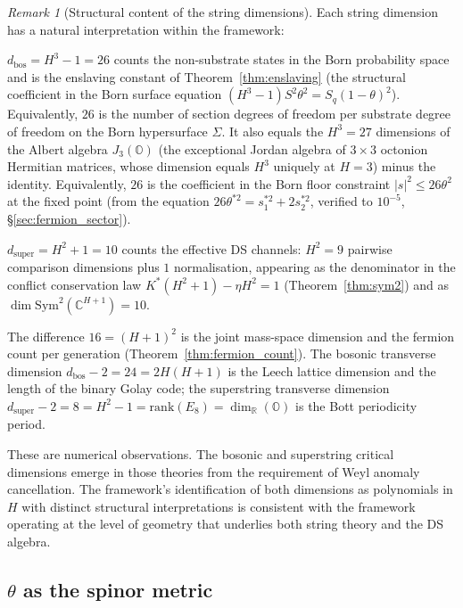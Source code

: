\documentclass[11pt,a4paper]{article}
\theoremstyle{definition}
\theoremstyle{remark}
\newtheorem{remark}[theorem]{Remark}
\newcommand{\C}{\mathbb{C}}
\begin{document}
\begin{remark}[Structural content of the string dimensions]\label{rem:string_content}
Each string dimension has a natural interpretation within the framework:

$d_\mathrm{bos}=H^3-1=26$ counts the non-substrate states in the Born probability space and is the enslaving constant of Theorem~\ref{thm:enslaving} (the structural coefficient in the Born surface equation $(H^3\!-\!1)S^2\theta^2=S_q(1-\theta)^2$). Equivalently, $26$ is the number of section degrees of freedom per substrate degree of freedom on the Born hypersurface $\Sigma$. It also equals the $H^3=27$ dimensions of the Albert algebra $J_3(\mathbb{O})$ (the exceptional Jordan algebra of $3\times 3$ octonion Hermitian matrices, whose dimension equals $H^3$ uniquely at $H=3$) minus the identity. Equivalently, $26$ is the coefficient in the Born floor constraint $|s|^2\leq 26\theta^2$ at the fixed point (from the equation $26\theta^{*2}=s_1^{*2}+2s_2^{*2}$, verified to $10^{-5}$, \S\ref{sec:fermion_sector}).

$d_\mathrm{super}=H^2+1=10$ counts the effective DS channels: $H^2=9$ pairwise comparison dimensions plus $1$ normalisation, appearing as the denominator in the conflict conservation law $K^*(H^2+1)-\eta H^2=1$ (Theorem~\ref{thm:sym2}) and as $\dim\mathrm{Sym}^2(\C^{H+1})=10$.

The difference $16=(H+1)^2$ is the joint mass-space dimension and the fermion count per generation (Theorem~\ref{thm:fermion_count}). The bosonic transverse dimension $d_\mathrm{bos}-2=24=2H(H+1)$ is the Leech lattice dimension and the length of the binary Golay code; the superstring transverse dimension $d_\mathrm{super}-2=8=H^2-1=\mathrm{rank}(E_8)=\dim_\mathbb{R}(\mathbb{O})$ is the Bott periodicity period.

These are numerical observations. The bosonic and superstring critical dimensions emerge in those theories from the requirement of Weyl anomaly cancellation. The framework's identification of both dimensions as polynomials in $H$ with distinct structural interpretations is consistent with the framework operating at the level of geometry that underlies both string theory and the DS algebra.
\end{remark}

\subsection{$\theta$ as the spinor metric}\label{sec:theta_spinor}
\end{document}
